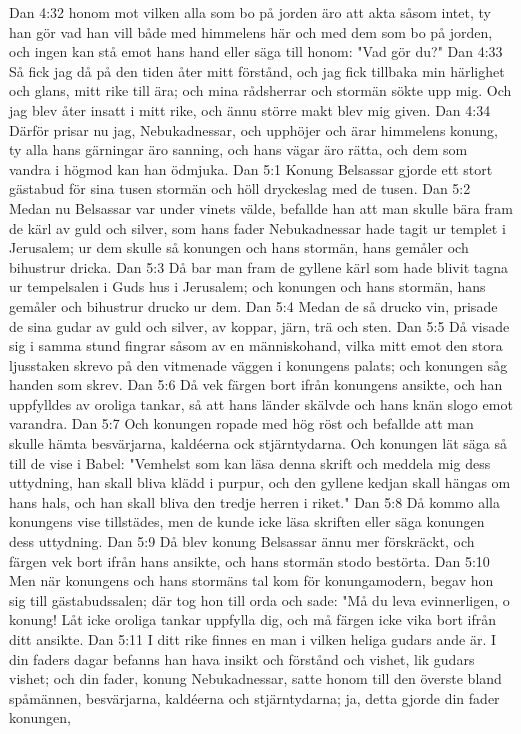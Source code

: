 Dan 4:32  honom mot vilken alla som bo på jorden äro att akta såsom intet, ty han gör vad han vill både med himmelens här och med dem som bo på jorden, och ingen kan stå emot hans hand eller säga till honom: "Vad gör du?"
Dan 4:33  Så fick jag då på den tiden åter mitt förstånd, och jag fick tillbaka min härlighet och glans, mitt rike till ära; och mina rådsherrar och stormän sökte upp mig. Och jag blev åter insatt i mitt rike, och ännu större makt blev mig given.
Dan 4:34  Därför prisar nu jag, Nebukadnessar, och upphöjer och ärar himmelens konung, ty alla hans gärningar äro sanning, och hans vägar äro rätta, och dem som vandra i högmod kan han ödmjuka.
Dan 5:1  Konung Belsassar gjorde ett stort gästabud för sina tusen stormän och höll dryckeslag med de tusen.
Dan 5:2  Medan nu Belsassar var under vinets välde, befallde han att man skulle bära fram de kärl av guld och silver, som hans fader Nebukadnessar hade tagit ur templet i Jerusalem; ur dem skulle så konungen och hans stormän, hans gemåler och bihustrur dricka.
Dan 5:3  Då bar man fram de gyllene kärl som hade blivit tagna ur tempelsalen i Guds hus i Jerusalem; och konungen och hans stormän, hans gemåler och bihustrur drucko ur dem.
Dan 5:4  Medan de så drucko vin, prisade de sina gudar av guld och silver, av koppar, järn, trä och sten.
Dan 5:5  Då visade sig i samma stund fingrar såsom av en människohand, vilka mitt emot den stora ljusstaken skrevo på den vitmenade väggen i konungens palats; och konungen såg handen som skrev.
Dan 5:6  Då vek färgen bort ifrån konungens ansikte, och han uppfylldes av oroliga tankar, så att hans länder skälvde och hans knän slogo emot varandra.
Dan 5:7  Och konungen ropade med hög röst och befallde att man skulle hämta besvärjarna, kaldéerna ock stjärntydarna. Och konungen lät säga så till de vise i Babel: "Vemhelst som kan läsa denna skrift och meddela mig dess uttydning, han skall bliva klädd i purpur, och den gyllene kedjan skall hängas om hans hals, och han skall bliva den tredje herren i riket."
Dan 5:8  Då kommo alla konungens vise tillstädes, men de kunde icke läsa skriften eller säga konungen dess uttydning.
Dan 5:9  Då blev konung Belsassar ännu mer förskräckt, och färgen vek bort ifrån hans ansikte, och hans stormän stodo bestörta.
Dan 5:10  Men när konungens och hans stormäns tal kom för konungamodern, begav hon sig till gästabudssalen; där tog hon till orda och sade: "Må du leva evinnerligen, o konung! Låt icke oroliga tankar uppfylla dig, och må färgen icke vika bort ifrån ditt ansikte.
Dan 5:11  I ditt rike finnes en man i vilken heliga gudars ande är. I din faders dagar befanns han hava insikt och förstånd och vishet, lik gudars vishet; och din fader, konung Nebukadnessar, satte honom till den överste bland spåmännen, besvärjarna, kaldéerna och stjärntydarna; ja, detta gjorde din fader konungen,
